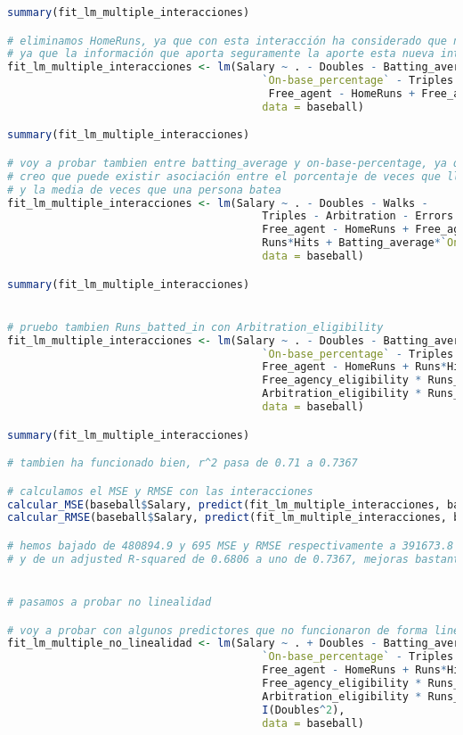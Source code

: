 \begin{lstlisting}[language=R]
summary(fit_lm_multiple_interacciones)

# eliminamos HomeRuns, ya que con esta interacción ha considerado que no es importante
# ya que la información que aporta seguramente la aporte esta nueva interaccion
fit_lm_multiple_interacciones <- lm(Salary ~ . - Doubles - Batting_average - Walks -
										`On-base_percentage` - Triples - Arbitration - Errors -
										 Free_agent - HomeRuns + Free_agency_eligibility*Runs_batted_in + Runs*Hits,
										data = baseball)

summary(fit_lm_multiple_interacciones)

# voy a probar tambien entre batting_average y on-base-percentage, ya que
# creo que puede existir asociación entre el porcentaje de veces que llega a una base
# y la media de veces que una persona batea
fit_lm_multiple_interacciones <- lm(Salary ~ . - Doubles - Walks -
										Triples - Arbitration - Errors -
										Free_agent - HomeRuns + Free_agency_eligibility*Runs_batted_in +
										Runs*Hits + Batting_average*`On-base_percentage`,
										data = baseball)

summary(fit_lm_multiple_interacciones)


# pruebo tambien Runs_batted_in con Arbitration_eligibility
fit_lm_multiple_interacciones <- lm(Salary ~ . - Doubles - Batting_average - Walks -
										`On-base_percentage` - Triples - Arbitration - Errors -
										Free_agent - HomeRuns + Runs*Hits +
										Free_agency_eligibility * Runs_batted_in +
										Arbitration_eligibility * Runs_batted_in,
										data = baseball)

summary(fit_lm_multiple_interacciones)

# tambien ha funcionado bien, r^2 pasa de 0.71 a 0.7367

# calculamos el MSE y RMSE con las interacciones
calcular_MSE(baseball$Salary, predict(fit_lm_multiple_interacciones, baseball))
calcular_RMSE(baseball$Salary, predict(fit_lm_multiple_interacciones, baseball))

# hemos bajado de 480894.9 y 695 MSE y RMSE respectivamente a 391673.8 y 627.7039,
# y de un adjusted R-squared de 0.6806 a uno de 0.7367, mejoras bastante significativas


# pasamos a probar no linealidad

# voy a probar con algunos predictores que no funcionaron de forma lineal
fit_lm_multiple_no_linealidad <- lm(Salary ~ . + Doubles - Batting_average - Walks -
										`On-base_percentage` - Triples - Arbitration - Errors -
										Free_agent - HomeRuns + Runs*Hits +
										Free_agency_eligibility * Runs_batted_in +
										Arbitration_eligibility * Runs_batted_in +
										I(Doubles^2),
										data = baseball)


\end{lstlisting}

